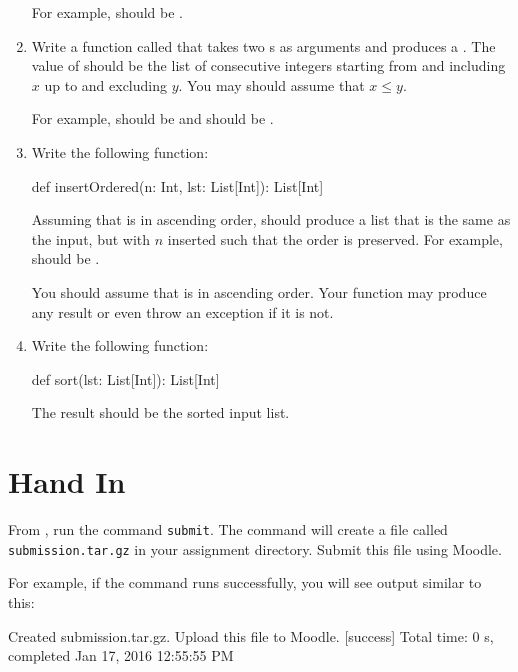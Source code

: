 \documentclass{book}
\begin{document}
\begin{enumerate}
  For example,  should
  be .

  \item Write a function called  that takes
  two s as arguments and produces a .
  The value of  should be the list of consecutive 
  integers starting from and including $x$ up to and excluding $y$. You may
  should assume that $x \le y$.

  For example,  should be 
  and  should be .

  \item Write the following function:

  \begin{scalacode}
  def insertOrdered(n: Int, lst: List[Int]): List[Int]
  \end{scalacode}

  Assuming that  is in ascending order,  
   should produce a list that is the same as
  the input, but with $n$ inserted such that the order is preserved.
  For example,  should be
  . 

  You should assume that  is in ascending order. Your function
   may produce any result or even throw an exception if it is not.

   \item Write the following function:

   \begin{scalacode}
   def sort(lst: List[Int]): List[Int]
   \end{scalacode}

   The result should be the sorted input list.

\end{enumerate}

\section{Hand In}

From \sbt{}, run the command \verb|submit|. The command will create
a file called \verb|submission.tar.gz| in your assignment directory.
Submit this file using Moodle.

For example, if the command runs successfully, you will see output similar
to this:
%
\begin{console}
Created submission.tar.gz. Upload this file to Moodle.
[success] Total time: 0 s, completed Jan 17, 2016 12:55:55 PM
\end{console}
\end{document}
